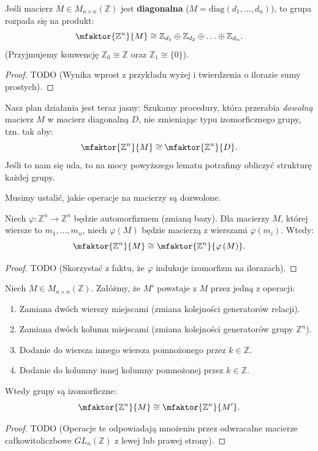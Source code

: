 \begin{lemma}
    Jeśli macierz $M\in M_{n\times n}\left( \mathbb{Z} \right)$ jest \textbf{diagonalna} ($M = \text{diag}(d_1, \dots, d_n)$), to grupa rozpada się na produkt:
    \[
    \mfaktor{\mathbb{Z} ^{n}}{M} \cong \mathbb{Z}_{d_1} \oplus \mathbb{Z}_{d_2} \oplus \ldots \oplus \mathbb{Z}_{d_n}.
    \]
    (Przyjmujemy konwencję $\mathbb{Z}_0 \cong \mathbb{Z}$ oraz $\mathbb{Z}_1 \cong \{0\}$).
\end{lemma}
\begin{proof}
    TODO (Wynika wprost z przykładu wyżej i twierdzenia o ilorazie sumy prostych).
\end{proof}

\begin{goal}
    Nasz plan działania jest teraz jasny: Szukamy procedury, która przerabia \textit{dowolną} macierz $M$ w macierz diagonalną $D$, nie zmieniając typu izomorficznego grupy, tzn. tak aby:
    \[
    \mfaktor{\mathbb{Z} ^{n}}{M} \cong \mfaktor{\mathbb{Z} ^{n}}{D}.
    \]
    Jeśli to nam się uda, to na mocy powyższego lematu potrafimy obliczyć strukturę każdej grupy.
\end{goal}

Musimy ustalić, jakie operacje na macierzy są dozwolone.

\begin{lemma}
    Niech $\varphi : \mathbb{Z}^n \to \mathbb{Z}^n$ będzie automorfizmem (zmianą bazy).
    Dla macierzy $M$, której wiersze to $m_1, \ldots, m_n$, niech $\varphi(M)$ będzie macierzą z wierszami $\varphi(m_i)$.
    Wtedy:
    \[
    \mfaktor{\mathbb{Z} ^{n}}{M} \cong \mfaktor{\mathbb{Z} ^{n}}{\varphi \left( M \right)}.
    \]
\end{lemma}
\begin{proof}
    TODO (Skorzystać z faktu, że $\varphi$ indukuje izomorfizm na ilorazach).
\end{proof}

\begin{lemma}
    Niech $M \in M_{n\times n}(\mathbb{Z})$. Załóżmy, że $M'$ powstaje z $M$ przez jedną z operacji:
    \begin{enumerate}[label=\roman*)]
        \item Zamiana dwóch wierszy miejscami (zmiana kolejności generatorów relacji).
        \item Zamiana dwóch kolumn miejscami (zmiana kolejności generatorów grupy $\mathbb{Z}^n$).
        \item Dodanie do wiersza innego wiersza pomnożonego przez $k \in \mathbb{Z}$.
        \item Dodanie do kolumny innej kolumny pomnożonej przez $k \in \mathbb{Z}$.
    \end{enumerate}
    Wtedy grupy są izomorficzne:
    \[
    \mfaktor{\mathbb{Z}^{n}}{M} \cong \mfaktor{\mathbb{Z} ^{n}}{M'}.
    \]
\end{lemma}
\begin{proof}
    TODO (Operacje te odpowiadają mnożeniu przez odwracalne macierze całkowitoliczbowe $GL_n(\mathbb{Z})$ z lewej lub prawej strony).
\end{proof}

